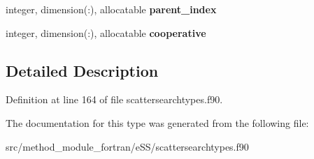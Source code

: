 \begin{DoxyCompactItemize}
\item 
\hypertarget{structscattersearchtypes_1_1refsettype_aac16472e8dd058047c675cd8c3f88860}{integer, dimension(\-:), allocatable {\bfseries parent\-\_\-index}}\label{structscattersearchtypes_1_1refsettype_aac16472e8dd058047c675cd8c3f88860}

\item 
\hypertarget{structscattersearchtypes_1_1refsettype_af016c7733839b601de6c3dbdd0493b6c}{integer, dimension(\-:), allocatable {\bfseries cooperative}}\label{structscattersearchtypes_1_1refsettype_af016c7733839b601de6c3dbdd0493b6c}

\end{DoxyCompactItemize}


\subsection{Detailed Description}


Definition at line 164 of file scattersearchtypes.\-f90.



The documentation for this type was generated from the following file\-:\begin{DoxyCompactItemize}
\item 
src/method\-\_\-module\-\_\-fortran/e\-S\-S/scattersearchtypes.\-f90\end{DoxyCompactItemize}
